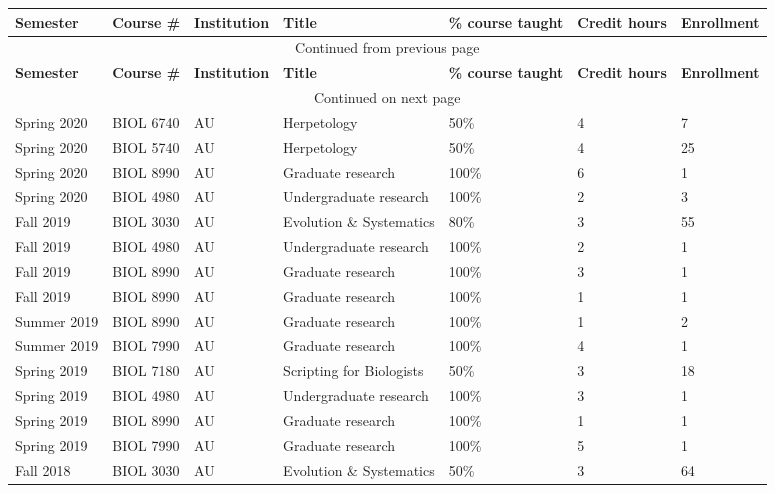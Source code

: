 {\sffamily\small
{}
\begin{longtable}[l]{ p{0.79in} p{0.65in} p{0.60in} p{1.7in} p{0.58in} p{0.34in} p{0.70in} }
    \hline
    \textbf{Semester} & \textbf{Course \#} & \textbf{Institution} & \textbf{Title} & \textbf{\% course taught} & \textbf{Credit hours} & \textbf{Enrollment} \\
    \hline
    \endfirsthead
    \multicolumn{7}{c}{{Continued from previous page}} \\
    \hline
    \textbf{Semester} & \textbf{Course \#} & \textbf{Institution} & \textbf{Title} & \textbf{\% course taught} & \textbf{Credit hours} & \textbf{Enrollment} \\
    \hline
    \endhead
    \hline \multicolumn{7}{c}{{Continued on next page}} \\
    \endfoot
    \hline
    \endlastfoot
    Spring 2020 & BIOL 6740 & AU & Herpetology & 50\% & 4 & 7 \\
    Spring 2020 & BIOL 5740 & AU & Herpetology & 50\% & 4 & 25 \\
    Spring 2020 & BIOL 8990 & AU & Graduate research & 100\% & 6 & 1 \\ 
    Spring 2020 & BIOL 4980 & AU & Undergraduate research & 100\% & 2 & 3 \\ 
    Fall 2019 & BIOL 3030 & AU & Evolution \& Systematics & 80\% & 3 & 55 \\
    Fall 2019 & BIOL 4980 & AU & Undergraduate research & 100\% & 2 & 1 \\ 
    Fall 2019 & BIOL 8990 & AU & Graduate research & 100\% & 3 & 1 \\ 
    Fall 2019 & BIOL 8990 & AU & Graduate research & 100\% & 1 & 1 \\ 
    Summer 2019 & BIOL 8990 & AU & Graduate research & 100\% & 1 & 2 \\ 
    Summer 2019 & BIOL 7990 & AU & Graduate research & 100\% & 4 & 1 \\ 
    Spring 2019 & BIOL 7180 & AU & Scripting for Biologists & 50\% & 3 & 18 \\
    Spring 2019 & BIOL 4980 & AU & Undergraduate research & 100\% & 3 & 1 \\ 
    Spring 2019 & BIOL 8990 & AU & Graduate research & 100\% & 1 & 1 \\ 
    Spring 2019 & BIOL 7990 & AU & Graduate research & 100\% & 5 & 1 \\ 
    Fall 2018 & BIOL 3030 & AU & Evolution \& Systematics & 50\% & 3 & 64 \\

\end{longtable}}
